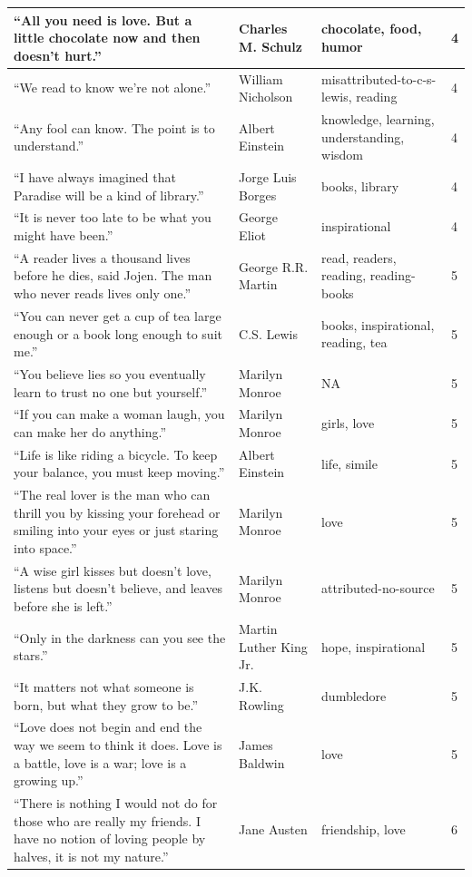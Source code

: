 \documentclass[
  letterpaper,
  DIV=11,
  numbers=noendperiod]{scrreprt}
\begin{document}
\begin{tabular}[t]{l|l|l|l}
\hline
“All you need is love. But a little chocolate now and then doesn't hurt.” & Charles M. Schulz & chocolate, food, humor & 4\\
\hline
“We read to know we're not alone.” & William Nicholson & misattributed-to-c-s-lewis, reading & 4\\
\hline
“Any fool can know. The point is to understand.” & Albert Einstein & knowledge, learning, understanding, wisdom & 4\\
\hline
“I have always imagined that Paradise will be a kind of library.” & Jorge Luis Borges & books, library & 4\\
\hline
“It is never too late to be what you might have been.” & George Eliot & inspirational & 4\\
\hline
“A reader lives a thousand lives before he dies, said Jojen. The man who never reads lives only one.” & George R.R. Martin & read, readers, reading, reading-books & 5\\
\hline
“You can never get a cup of tea large enough or a book long enough to suit me.” & C.S. Lewis & books, inspirational, reading, tea & 5\\
\hline
“You believe lies so you eventually learn to trust no one but yourself.” & Marilyn Monroe & NA & 5\\
\hline
“If you can make a woman laugh, you can make her do anything.” & Marilyn Monroe & girls, love & 5\\
\hline
“Life is like riding a bicycle. To keep your balance, you must keep moving.” & Albert Einstein & life, simile & 5\\
\hline
“The real lover is the man who can thrill you by kissing your forehead or smiling into your eyes or just staring into space.” & Marilyn Monroe & love & 5\\
\hline
“A wise girl kisses but doesn't love, listens but doesn't believe, and leaves before she is left.” & Marilyn Monroe & attributed-no-source & 5\\
\hline
“Only in the darkness can you see the stars.” & Martin Luther King Jr. & hope, inspirational & 5\\
\hline
“It matters not what someone is born, but what they grow to be.” & J.K. Rowling & dumbledore & 5\\
\hline
“Love does not begin and end the way we seem to think it does. Love is a battle, love is a war; love is a growing up.” & James Baldwin & love & 5\\
\hline
“There is nothing I would not do for those who are really my friends. I have no notion of loving people by halves, it is not my nature.” & Jane Austen & friendship, love & 6\\

\end{tabular}
\end{document}
